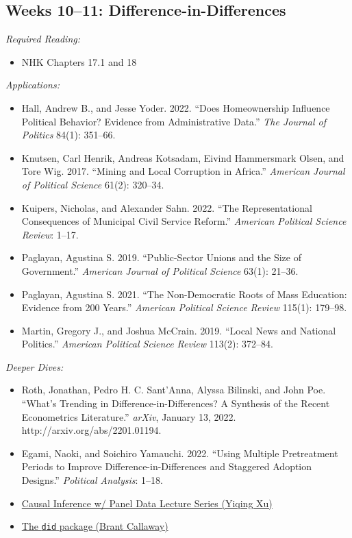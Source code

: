 \documentclass[11pt, letterpaper]{article}
\begin{document}
\subsection*{Weeks 10--11: Difference-in-Differences}

\textit{Required Reading:}

\begin{itemize}
	\item NHK Chapters 17.1 and 18
\end{itemize}

\noindent \textit{Applications:}

\begin{itemize}
	\item Hall, Andrew B., and Jesse Yoder. 2022. ``Does Homeownership Influence Political Behavior? Evidence from Administrative Data.'' \textit{The Journal of Politics} 84(1): 351–66.
	\item Knutsen, Carl Henrik, Andreas Kotsadam, Eivind Hammersmark Olsen, and Tore Wig. 2017. ``Mining and Local Corruption in Africa.'' \textit{American Journal of Political Science} 61(2): 320–34.
	\item Kuipers, Nicholas, and Alexander Sahn. 2022. ``The Representational Consequences of Municipal Civil Service Reform.'' \textit{American Political Science Review}: 1–17.
	\item Paglayan, Agustina S. 2019. ``Public-Sector Unions and the Size of Government.'' \textit{American Journal of Political Science} 63(1): 21–36.
	\item Paglayan, Agustina S. 2021. ``The Non-Democratic Roots of Mass Education: Evidence from 200 Years.'' \textit{American Political Science Review} 115(1): 179–98.
	\item Martin, Gregory J., and Joshua McCrain. 2019. “Local News and National Politics.” \textit{American Political Science Review} 113(2): 372–84.
\end{itemize}

\noindent \textit{Deeper Dives:}

\begin{itemize}
	\item Roth, Jonathan, Pedro H. C. Sant’Anna, Alyssa Bilinski, and John Poe. ``What’s Trending in Difference-in-Differences? A Synthesis of the Recent Econometrics Literature.'' \textit{arXiv}, January 13, 2022. http://arxiv.org/abs/2201.01194.
	\item Egami, Naoki, and Soichiro Yamauchi. 2022. ``Using Multiple Pretreatment Periods to Improve Difference-in-Differences and Staggered Adoption Designs.'' \textit{Political Analysis}: 1–18.
	\item \href{https://www.youtube.com/user/ariesxyq/videos}{Causal Inference w/ Panel Data Lecture Series (Yiqing Xu)}
	\item \href{https://bcallaway11.github.io/did/articles/did-basics.html}{The \texttt{did} package (Brant Callaway)}
\end{itemize}
\end{document}
